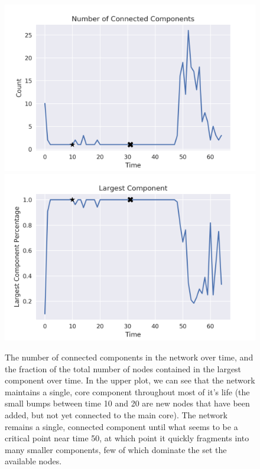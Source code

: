 \documentclass{paper}
\begin{document}
	\begin{figure}[h]
		\centering
		\includegraphics[scale=0.75]{num_components.png}
		\includegraphics[scale=0.75]{largest_component.png}
		\caption{The number of connected components in the network over time, and the fraction of the total number of nodes contained in the largest component over time. In the upper plot, we can see that the network maintains a single, core component throughout most of it's life (the small bumps between time 10 and 20 are new nodes that have been added, but not yet connected to the main core). The network remains a single, connected component until what seems to be a critical point near time 50, at which point it quickly fragments into many smaller components, few of which dominate the set the available nodes.}
		\label{components}
	\end{figure}
	
\end{document}
